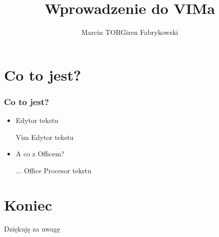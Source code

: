 \documentclass{beamer}
\author{Marcin TORGiren Fabrykowski}
\title{Wprowadzenie do VIMa}
\institute{AGH - University of Science and Technology}
\begin{document}
\maketitle
\newpage
\tableofcontents
\section{Co to jest?}
\begin{frame}
\frametitle{Co to jest?}
\begin{itemize}[<+->]
\item Edytor tekstu
\begin{block}{Vim}
Edytor tekstu
\end{block}
\item A co z Officem?
\begin{block}{... Office}
Procesor tekstu
\end{block}
\end{itemize}
\end{frame}
\section{Koniec}
\begin{frame}
Dziękuję za uwagę
\end{frame}
\end{document}
